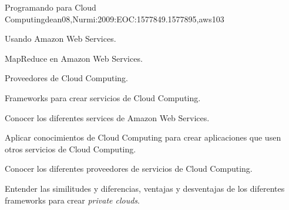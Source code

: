 \begin{syllabus}
\begin{unit}{Programando para Cloud Computing}{dean08,Nurmi:2009:EOC:1577849.1577895,aws}{10}{3}
   \begin{topics}
      \item Usando Amazon Web Services.
      \item MapReduce en Amazon Web Services.
      \item Proveedores de Cloud Computing.
      \item Frameworks para crear servicios de Cloud Computing.
   \end{topics}

   \begin{unitgoals}
      \item Conocer los diferentes services de Amazon Web Services.
      \item Aplicar conocimientos de Cloud Computing para crear aplicaciones que usen otros servicios de Cloud Computing.
      \item Conocer los diferentes proveedores de servicios de Cloud Computing.
      \item Entender las similitudes y diferencias, ventajas y desventajas de los diferentes frameworks para crear \textit{private clouds}.
   \end{unitgoals}
\end{unit}



\begin{coursebibliography}
\end{coursebibliography}

\end{syllabus}
